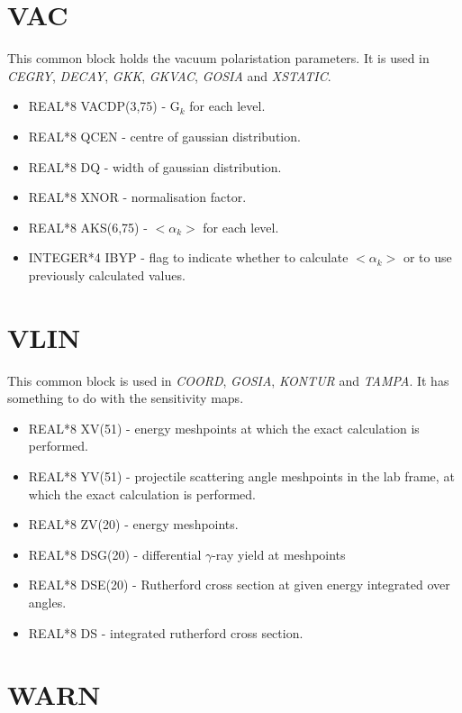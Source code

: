 \section{VAC}

This common block holds the vacuum polaristation parameters. It is used in
\emph{CEGRY}, \emph{DECAY}, \emph{GKK}, \emph{GKVAC}, \emph{GOSIA} and \emph{
XSTATIC}.

\begin{itemize}
\item REAL*8 VACDP(3,75) - G$_k$ for each level.
\item REAL*8 QCEN - centre of gaussian distribution.
\item REAL*8 DQ - width of gaussian distribution.
\item REAL*8 XNOR - normalisation factor.
\item REAL*8 AKS(6,75) - $<\alpha_k>$ for each level.
\item INTEGER*4 IBYP - flag to indicate whether to calculate $<\alpha_k>$ or
to use previously calculated values.
\end{itemize}

\section{VLIN}

This common block is used in \emph{COORD}, \emph{GOSIA}, \emph{KONTUR} and \emph{
TAMPA}. It has something to do with the sensitivity maps.

\begin{itemize}
\item REAL*8 XV(51) - energy meshpoints at which the exact calculation is
performed.
\item REAL*8 YV(51) - projectile scattering angle meshpoints in the lab
frame, at which the exact calculation is performed.
\item REAL*8 ZV(20) - energy meshpoints.
\item REAL*8 DSG(20) - differential $\gamma$-ray yield at meshpoints
\item REAL*8 DSE(20) - Rutherford cross section at given energy integrated
over angles.
\item REAL*8 DS - integrated rutherford cross section.
\end{itemize}

\section{WARN}

